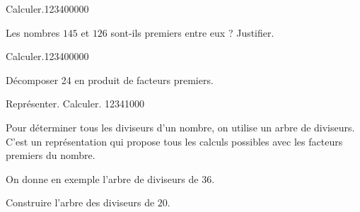 \begin{pageAD} 




\begin{ExoCad}{Calculer.}{1234}{0}{0}{0}{0}{0}

Les nombres $145$ et $126$ sont-ils premiers entre eux ? Justifier.


\end{ExoCad}





\begin{ExoCad}{Calculer.}{1234}{0}{0}{0}{0}{0}

Décomposer 24 en produit de facteurs premiers.


\end{ExoCad}

\begin{ExoCad}{Représenter. Calculer. }{1234}{1}{0}{0}{0}

\begin{minipage}{0.55\linewidth}

Pour déterminer tous les diviseurs d'un nombre, on utilise un arbre de diviseurs. C'est un représentation qui propose tous les calculs possibles avec les facteurs premiers du nombre.

On donne en exemple l'arbre de diviseurs de $36$.

Construire l'arbre des diviseurs de $20$.

\vspace{4cm}

\end{minipage}
\begin{minipage}{0.4\linewidth}


\end{minipage}
\end{ExoCad}
\end{pageAD}
